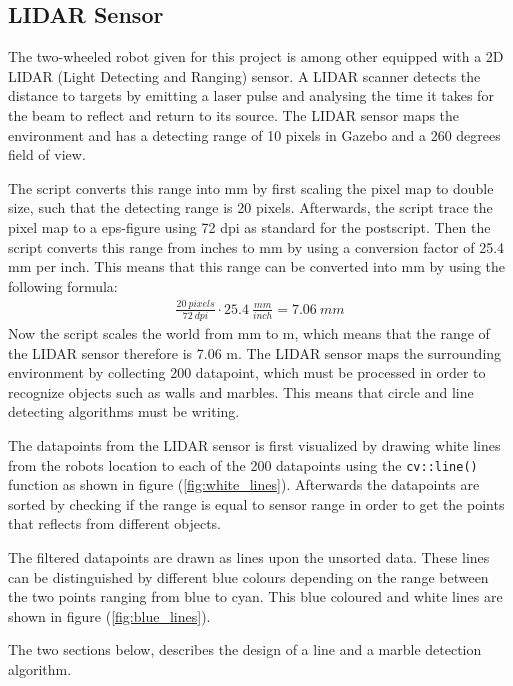 \documentclass[../Head/Main.tex]{subfiles}
\begin{document}
\subsection{LIDAR Sensor}
The two-wheeled robot given for this project is among other equipped with a 2D LIDAR (Light Detecting and Ranging) sensor. A LIDAR scanner detects the distance to targets by emitting a laser pulse and analysing the time it takes for the beam to reflect and return to its source. The LIDAR sensor maps the environment and has a detecting range of 10 pixels in Gazebo and a 260 degrees field of view. \par
The script converts this range into mm by first scaling the pixel map to double size, such that the detecting range is 20 pixels. Afterwards, the script trace the pixel map to a eps-figure using 72 dpi as standard for the postscript. Then the script converts this range from inches to mm by using a conversion factor of 25.4 mm per inch. This means that this range can be converted into mm by using the following formula:
\begin{align*}
\frac{20~pixels}{72~dpi}\cdot 25.4~\frac{mm}{inch} = 7.06~mm
\end{align*}
Now the script scales the world from mm to m, which means that the range of the LIDAR sensor therefore is 7.06 m.
The LIDAR sensor maps the surrounding environment by collecting 200 datapoint, which must be processed in order to recognize objects such as walls and marbles. This means that circle and line detecting algorithms must be writing.

\clearpage
The datapoints from the LIDAR sensor is first visualized by drawing white lines from the robots location to each of the 200 datapoints using the \texttt{cv::line()} function as shown in figure (\ref{fig:white_lines}). Afterwards the datapoints are sorted by checking if the range is equal to sensor range in order to get the points that reflects from different objects.\par

The filtered datapoints are drawn as lines upon the unsorted data. These lines can be distinguished by different blue colours depending on the range between the two points ranging from blue to cyan. This blue coloured and white lines are shown in figure (\ref{fig:blue_lines}).

The two sections below, describes the design of a line and a marble detection algorithm.


\end{document}
